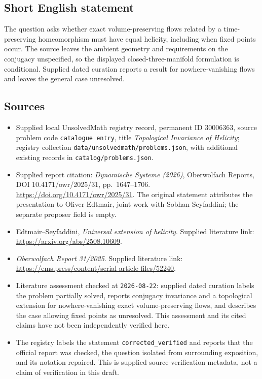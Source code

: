 \documentclass[11pt]{article}
\begin{document}
\subsection{Short English statement}
The question asks whether exact volume-preserving flows related by a time-preserving homeomorphism must have equal helicity, including when fixed points occur. The source leaves the ambient geometry and requirements on the conjugacy unspecified, so the displayed closed-three-manifold formulation is conditional. Supplied dated curation reports a result for nowhere-vanishing flows and leaves the general case unresolved.
\subsection{Sources}
\begin{itemize}
\item Supplied local UnsolvedMath registry record, permanent ID \(30006363\), source problem code \texttt{catalogue entry}, title \emph{Topological Invariance of Helicity}; registry collection \texttt{data/unsolvedmath/problems.json}, with additional existing records in \texttt{catalog/problems.json}.
\item Supplied report citation: \emph{Dynamische Systeme (2026)}, Oberwolfach Reports, DOI 10.4171/owr/2025/31, pp.~1647--1706. \url{https://doi.org/10.4171/owr/2025/31}. The original statement attributes the presentation to Oliver Edtmair, joint work with Sobhan Seyfaddini; the separate proposer field is empty.
\item Edtmair--Seyfaddini, \emph{Universal extension of helicity}. Supplied literature link: \url{https://arxiv.org/abs/2508.10609}.
\item \emph{Oberwolfach Report 31/2025}. Supplied literature link: \url{https://ems.press/content/serial-article-files/52240}.
\item Literature assessment checked at \texttt{2026-08-22}: supplied dated curation labels the problem partially solved, reports conjugacy invariance and a topological extension for nowhere-vanishing exact volume-preserving flows, and describes the case allowing fixed points as unresolved. This assessment and its cited claims have not been independently verified here.
\item The registry labels the statement \texttt{corrected\_verified} and reports that the official report was checked, the question isolated from surrounding exposition, and its notation repaired. This is supplied source-verification metadata, not a claim of verification in this draft.
\end{itemize}
\end{document}
